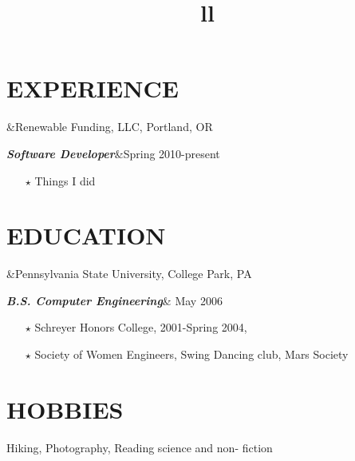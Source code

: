 \documentclass[11pt]{res} %
\begin{document}
 
 

\address{{\bf CONTACT INFORMATION} \\   Portland, OR \\   \href{mailto:laurie.kemmerer@gmail.com}{laurie.kemmerer@gmail.com}
          \\ (503) 866-4437}
\address{{\bf } \\ \url{http://github.com/lkemmerer} \\ \href{http://twitter.com/im\_a\_radish}{@im\_a\_radish}}
 
                                             
\begin{resume}
 
\section{EXPERIENCE} 
\begin{ncolumn}{2}
	&\hfill{}Renewable Funding, LLC, Portland, OR \\
\end{ncolumn}{}
\begin{ncolumn}{2}
	\title{l}\textbf{\itshape Software Developer}&\hfill{}Spring 2010-present \\
\end{ncolumn}
\begin{itemize} \itemsep -2pt
	\item[$\star$] Things I did
\end{itemize}

 
\section{EDUCATION} 
 \begin{ncolumn}{2}
	&\hfill{}Pennsylvania State University, College Park, PA\\
\end{ncolumn}{}
 \begin{ncolumn}{2}
	\title{l}\textbf{\itshape B.S. Computer Engineering}&\hfill{} May 2006 \\
\end{ncolumn}{}
\begin{itemize} \itemsep -2pt
	\item[$\star$] Schreyer Honors College, 2001-Spring 2004, 
	\item[$\star$] Society of Women Engineers, Swing Dancing club, Mars Society
\end{itemize}
 
\section{HOBBIES} 
 
Hiking, Photography, Reading science and non- fiction
 
 

\end{resume}
\end{document}
